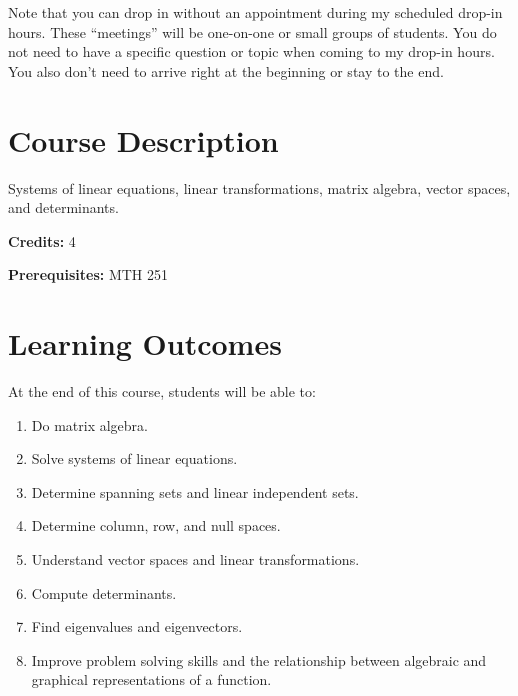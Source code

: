 \documentclass{article}
\begin{document}
    
    \maketitle

	\noindent
	Note that you can drop in without an appointment during my scheduled drop-in hours.
	These ``meetings'' will be one-on-one or small groups of students. You do not need
	to have a specific question or topic when coming to my drop-in hours. You also
	don't need to arrive right at the beginning or stay to the end.

	\section*{Course Description}
	Systems of linear equations, linear transformations, matrix algebra, vector spaces,
	and determinants.

	\noindent
	\textbf{Credits:} 4

	\noindent
	\textbf{Prerequisites:} MTH 251

	\section*{Learning Outcomes}
	At the end of this course, students will be able to:
	\begin{enumerate}
		\item Do matrix algebra.

		\item Solve systems of linear equations.

		\item Determine spanning sets and linear independent sets.

		\item Determine column, row, and null spaces.

		\item Understand vector spaces and linear transformations.

		\item Compute determinants.

		\item Find eigenvalues and eigenvectors.

		\item Improve problem solving skills and the relationship between algebraic and
			graphical representations of a function.
	\end{enumerate}
\end{document}
